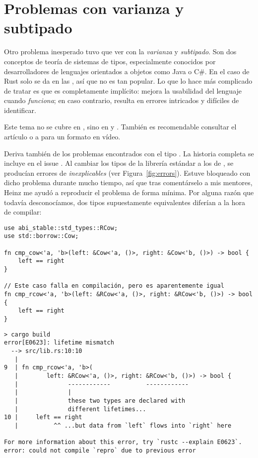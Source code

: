 \chapter{Problemas con varianza y subtipado}\label{annex:covariance}

Otro problema inesperado tuvo que ver con la \emph{varianza} y \emph{subtipado}.
Son dos conceptos de teoría de sistemas de tipos, especialmente conocidos por
desarrolladores de lenguajes orientados a objetos como Java o C\#. En el caso de
Rust solo se da en las \lifetimes, así que no es tan popular. Lo que lo hace más
complicado de tratar es que es completamente implícito: mejora la usabilidad del
lenguaje cuando \emph{funciona}; en caso contrario, resulta en errores
intricados y difíciles de identificar.

Este tema no se cubre en , sino en  y . También es
recomendable consultar el artículo  o a
\textcite{video_covandcontra} para un formato en vídeo.

Deriva también de los problemas encontrados con el tipo . La
historia completa se incluye en el issue . Al cambiar
los tipos de la librería estándar a los de \abistable, se producían errores de
\lifetimes \emph{inexplicables} (ver Figura~\ref{fig:errors}). Estuve bloqueado
con dicho problema durante mucho tiempo, así que tras comentárselo a mis
mentores, Heinz me ayudó a reproducir el problema de forma mínima. Por alguna
razón que todavía desconocíamos, dos tipos supuestamente equivalentes diferían a
la hora de compilar:

\begin{verbatim}
use abi_stable::std_types::RCow;
use std::borrow::Cow;

fn cmp_cow<'a, 'b>(left: &Cow<'a, ()>, right: &Cow<'b, ()>) -> bool {
    left == right
}

// Este caso falla en compilación, pero es aparentemente igual
fn cmp_rcow<'a, 'b>(left: &RCow<'a, ()>, right: &RCow<'b, ()>) -> bool {
    left == right
}
\end{verbatim}

\begin{verbatim}
> cargo build
error[E0623]: lifetime mismatch
  --> src/lib.rs:10:10
   |
9  | fn cmp_rcow<'a, 'b>(
   |        left: &RCow<'a, ()>, right: &RCow<'b, ()>) -> bool {
   |              ------------          ------------
   |              |
   |              these two types are declared with
   |              different lifetimes...
10 |     left == right
   |          ^^ ...but data from `left` flows into `right` here

For more information about this error, try `rustc --explain E0623`.
error: could not compile `repro` due to previous error
\end{verbatim}

